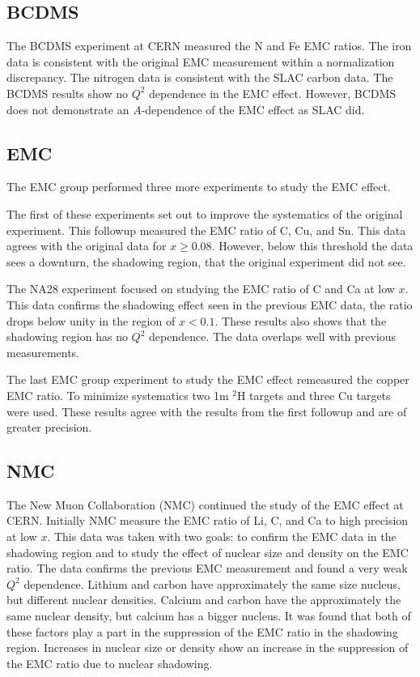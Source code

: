 
\subsection{BCDMS}
The BCDMS experiment at CERN measured the N and Fe EMC ratios. The iron data is consistent with the original EMC measurement within a normalization discrepancy. The nitrogen data is consistent with the SLAC carbon data. The BCDMS results show no $Q^2$ dependence in the EMC effect. However, BCDMS does not demonstrate an $A$-dependence of the EMC effect as SLAC did.\cite{Norton} %

\subsection{EMC} 
The EMC group performed three more experiments to study the EMC effect.

The first of these experiments set out to improve the systematics of the original experiment. This followup measured the EMC ratio of C, Cu, and Sn. This data agrees with the original data for $x \geq 0.08$. However, below this threshold the data sees a downturn, the shadowing region, that the original experiment did not see.\cite{ashmanEMC}

The NA28 experiment focused on studying the EMC ratio of C and Ca at low $x$. This data confirms the shadowing effect seen in the previous EMC data, the ratio drops below unity in the region of $x<0.1$. These results also shows that the shadowing region has no $Q^2$ dependence. The data overlaps well with previous measurements.

The last EMC group experiment to study the EMC effect remeasured the copper EMC ratio. To minimize systematics two 1m $^2$H targets and three Cu targets were used. These results agree with the results from the first followup and are of greater precision. %

\subsection{NMC}
The New Muon Collaboration (NMC) continued the study of the EMC effect at CERN. Initially NMC measure the EMC ratio of Li, C, and Ca to high precision at low $x$. This data was taken with two goals: to confirm the EMC data in the shadowing region and to study the effect of nuclear size and density on the EMC ratio. The data confirms the previous EMC measurement and found a very weak $Q^2$ dependence. Lithium and carbon have approximately the same size nucleus, but different nuclear densities. Calcium and carbon have the approximately the same nuclear density, but calcium has a bigger nucleus. It was found that both of these factors play a part in the suppression of the EMC ratio in the shadowing region. Increases in nuclear size or density show an increase in the suppression of the EMC ratio due to nuclear shadowing.

